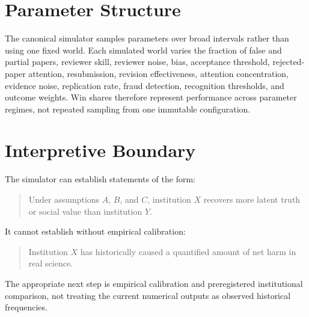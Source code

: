 \appendix
\section{Parameter Structure}

The canonical simulator samples parameters over broad intervals rather than using one fixed world. Each simulated world varies the fraction of false and partial papers, reviewer skill, reviewer noise, bias, acceptance threshold, rejected-paper attention, resubmission, revision effectiveness, attention concentration, evidence noise, replication rate, fraud detection, recognition thresholds, and outcome weights. Win shares therefore represent performance across parameter regimes, not repeated sampling from one immutable configuration.

\section{Interpretive Boundary}

The simulator can establish statements of the form:

\begin{quote}
Under assumptions $A$, $B$, and $C$, institution $X$ recovers more latent truth or social value than institution $Y$.
\end{quote}

It cannot establish without empirical calibration:

\begin{quote}
Institution $X$ has historically caused a quantified amount of net harm in real science.
\end{quote}

The appropriate next step is empirical calibration and preregistered institutional comparison, not treating the current numerical outputs as observed historical frequencies.
